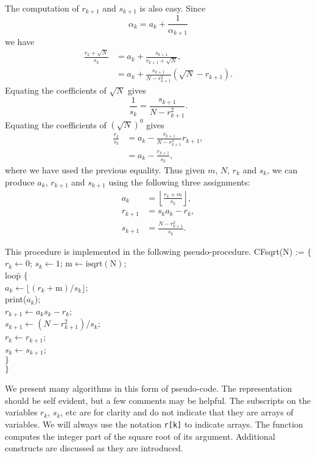 The computation of $r_{k+1}$ and $s_{k+1}$ is also easy.  Since
\[
\alpha_k = a_k + \frac{1}{\alpha_{k+1}}
\]
we have
\[
\begin{aligned}
\frac{r_k + \sqrt{N}}{s_k} 
  & = a_k + \frac{s_{k+1}}{r_{k+1}+\sqrt{N}}, \\
  & = a_k + \frac{s_{k+1}}{N - r_{k+1}^2} \left( \sqrt{N} -
r_{k+1}\right).
\end{aligned}
\]
Equating the coefficients of $\sqrt{N}$ gives
\[
\frac{1}{s_k} = \frac{s_{k+1}}{N - r_{k+1}^2}.
\]
Equating the coefficients of $(\sqrt{N})^0$ gives
\[
\begin{aligned}
  \frac{r_{k}}{s_{k}} & = a_k - \frac{s_{k+1}}{N - r_{k+1}^2} r_{k+1}, \\
      & = a_k - \frac{r_{k+1}}{s_k},
\end{aligned}
\]
where we have used the previous equality.  Thus given $m$, $N$, $r_k$
and $s_k$, we can produce $a_k$, $r_{k+1}$ and $s_{k+1}$ using the
following three assignments:
\[
\begin{aligned}
 a_k &= \displaystyle \left\lfloor \frac{r_k + m}{s_k} \right\rfloor, \\
 r_{k+1} & = s_k a_k - r_k, \\
 s_{k+1} & = \frac{N - r_{k+1}^2}{s_k}.
\end{aligned}
\]

This procedure is implemented  in the following
pseudo-procedure.
\begindsacode
CFsqrt(N) := $\{$\\
 \> $r_k \leftarrow  0$; $s_k \leftarrow 1$; $\mbox{m} \leftarrow \mbox{isqrt}(\mbox{N})$; \\
 \> loo\=p $\{$ \\
 \> \> $a_k \leftarrow  \lfloor (r_k+ \mbox{m})/s_k\rfloor$; \\
 \> \> print($a_k$); \\
 \> \> $r_{k+1} \leftarrow a_k s_k - r_k$; \\
 \> \> $s_{k+1} \leftarrow (N - r_{k+1}^2)/s_k$; \\
 \> \> $r_k \leftarrow r_{k+1}$; \\
 \> \> $s_k \leftarrow s_{k+1}$; \\
 \> \> $\}$ \\
 \> $\}$
\enddsacode

We present many algorithms in this form of pseudo-code.  The
representation should be self evident, but a few comments may be
helpful.  The subscripts on the variables $r_k$, $s_k$, etc are for
clarity and do not indicate that they are arrays of variables.  We
will always use the notation {\tt r[k]} to indicate arrays.  The
function  computes the integer part of the square root of
its argument.  Additional constructs are discussed as they are
introduced.


